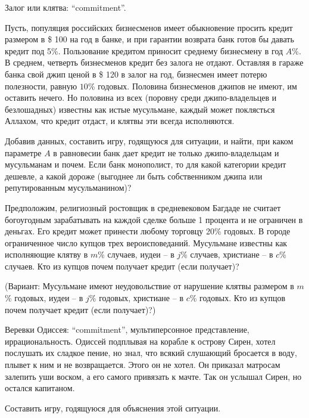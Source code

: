 \documentclass[a4paper,12pt]{article}
\begin{document}
\begin{exmp}\rm
{\rm Залог или клятва: ``commitment''.}

Пусть, популяция российских бизнесменов имеет обыкновение
просить кредит размером в \$ 100 на год в банке, и при
гарантии возврата банк готов бы давать кредит под 5\%.
Пользование кредитом приносит среднему бизнесмену в год
$A$\%. В среднем, четверть бизнесменов кредит без залога не
отдают. Оставляя в гараже банка свой джип ценой в \$ 120  в
залог на год, бизнесмен имеет потерю полезности, равную
$10$\% годовых. Половина бизнесменов джипов не имеют, им
оставить нечего. Но половина из всех (поровну среди
джипо-владельцев и безлошадных) известны как истые
мусульмане, каждый может поклясться Аллахом, что кредит
отдаст, и клятвы эти всегда исполняются.

Добавив данных, составить игру, годящуюся для ситуации, и
найти, при каком параметре $A$ в равновесии банк дает
кредит не только джипо-владельцам и мусульманам и почем.
Если банк монополист, то для какой категории кредит
дешевле, а какой дороже (выгоднее ли быть собственником
джипа или репутированным мусульманином)?
\end{exmp}

\begin{exmp}
Предположим, религиозный ростовщик в средневековом Багдаде
не считает богоугодным зарабатывать на каждой сделке больше
1 процента и не ограничен в деньгах. Его кредит может
принести любому торговцу 20\% годовых. В городе
ограниченное число купцов трех вероисповеданий. Мусульмане
известны как исполняющие клятву в $m$\% случаев, иудеи -- в
$j$\% случаев, христиане -- в $c$\% случаев. Кто из купцов
почем получает кредит (если получает)?

(Вариант: Мусульмане имеют неудовольствие от нарушение
клятвы размером в $m$\% годовых, иудеи -- в $j$\% годовых,
христиане -- в $c$\% годовых. Кто из купцов почем получает
кредит (если получает)?)
\end{exmp}

\begin{exmp}\rm
{\rm Веревки Одиссея: ``commitment'', мультиперсонное
представление, иррациональность.} Одиссей подплывая на
корабле к острову Сирен, хотел послушать их сладкое пение,
но знал, что всякий слушающий бросается в воду, плывет к
ним и не возвращается. Этого он не хотел. Он приказал
матросам залепить уши воском, а его самого привязать к
мачте. Так он услышал Сирен, но остался капитаном.

Составить  игру, годящуюся для объяснения этой ситуации.
\end{exmp}
\end{document}
